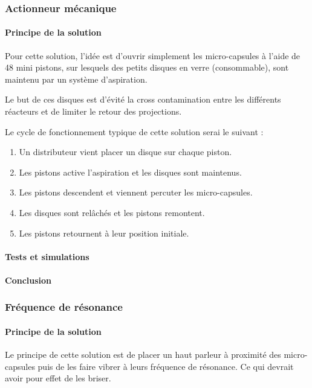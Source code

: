\subsubsection{Actionneur mécanique}
\paragraph{Principe de la solution}
Pour cette solution, l'idée est d'ouvrir simplement les micro-capsules à l'aide de 48 mini pistons, 
sur lesquels des petits disques en verre (consommable), sont maintenu par un système d'aspiration.

\vspace{0.3cm}
Le but de ces disques est d'évité la cross contamination entre les différents réacteurs et de limiter le retour 
des projections.

\vspace{0.3cm}
Le cycle de fonctionnement typique de cette solution serai le suivant :
\begin{enumerate}
    \item Un distributeur vient placer un disque sur chaque piston.
    \item Les pistons active l'aspiration et les disques sont maintenus.
    \item Les pistons descendent et viennent percuter les micro-capsules.
    \item Les disques sont relâchés et les pistons remontent.
    \item Les pistons retournent à leur position initiale.
\end{enumerate}

\paragraph{Tests et simulations}

\paragraph{Conclusion}

\subsubsection{Fréquence de résonance}
\paragraph{Principe de la solution}
Le principe de cette solution est de placer un haut parleur à proximité des micro-capsules puis de les faire vibrer à leurs fréquence de résonance.
Ce qui devrait avoir pour effet de les briser.


